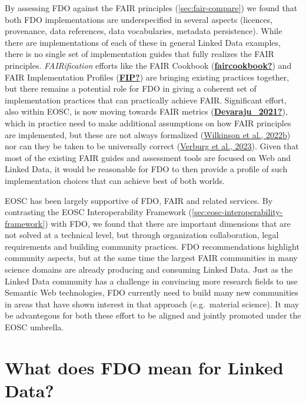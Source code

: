 By assessing FDO against the FAIR principles
(\protect\hyperlink{sec:fair-compare}{{[}sec:fair-compare{]}}) we found that both FDO implementations
are underspecified in several aspects (licences, provenance, data
references, data vocabularies, metadata persistence). While there are
implementations of each of these in general Linked Data examples, there
is no single set of implementation guides that fully realizes the FAIR
principles. \emph{FAIRification} efforts like the FAIR Cookbook
(\protect\hyperlink{ref-faircookbook}{\textbf{faircookbook?}}) and FAIR Implementation Profiles (\protect\hyperlink{ref-FIP}{\textbf{FIP?}}) are bringing
existing practices together, but there remains a potential role for FDO
in giving a coherent set of implementation practices that can
practically achieve FAIR. Significant effort, also within EOSC, is now
moving towards FAIR metrics (\protect\hyperlink{ref-Devaraju_2021}{\textbf{Devaraju\_2021?}}), which in practice need to
make additional assumptions on how FAIR principles are implemented, but
these are not always formalized (\protect\hyperlink{ref-HkdfgHs}{Wilkinson et al., 2022b}) nor can they
be taken to be universally correct (\protect\hyperlink{ref-JazFAhMJ}{Verburg et al., 2023}). Given that
most of the existing FAIR guides and assessment tools are focused on Web
and Linked Data, it would be reasonable for FDO to then provide a
profile of such implementation choices that can achieve best of both
worlds.

EOSC has been largely supportive of FDO, FAIR and related services. By
contrasting the EOSC Interoperability Framework
(\protect\hyperlink{sec:eosc-interoperability-framework}{{[}sec:eosc-interoperability-framework{]}}) with FDO, we found
that there are important dimensions that are not solved at a technical
level, but through organization collaboration, legal requirements and
building community practices. FDO recommendations highlight community
aspects, but at the same time the largest FAIR communities in many
science domains are already producing and consuming Linked Data. Just as
the Linked Data community has a challenge in convincing more research
fields to use Semantic Web technologies, FDO currently need to build
many new communities in areas that have shown interest in that approach
(e.g.~material science). It may be advantegous for both these effort to
be aligned and jointly promoted under the EOSC umbrella.

\hypertarget{sec:what-does-it-mean-for-linked-data}{%
\section*{What does FDO mean for Linked Data?}\label{sec:what-does-it-mean-for-linked-data}}

